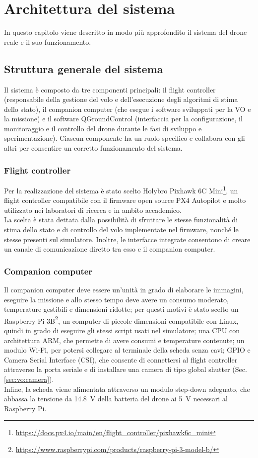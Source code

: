 \chapter{Architettura del sistema}
\label{chap:archi_sistema}
In questo capitolo viene descritto in modo più approfondito il sistema del drone reale e il suo funzionamento.

\section{Struttura generale del sistema}
Il sistema è composto da tre componenti principali: il flight controller (responsabile della gestione del volo e dell'esecuzione degli algoritmi di stima dello stato), il companion computer (che esegue i software sviluppati per la VO e la missione) e il software QGroundControl (interfaccia per la configurazione, il monitoraggio e il controllo del drone durante le fasi di sviluppo e sperimentazione). Ciascun componente ha un ruolo specifico e collabora con gli altri per consentire un corretto funzionamento del sistema.

\subsection{Flight controller}
\label{sec:archi:controller}
Per la realizzazione del sistema è stato scelto Holybro Pixhawk 6C Mini\footnote{\url{https://docs.px4.io/main/en/flight_controller/pixhawk6c_mini}}, un flight controller compatibile con il firmware open source PX4 Autopilot e molto utilizzato nei laboratori di ricerca e in ambito accademico. \\
La scelta è stata dettata dalla possibilità di sfruttare le stesse funzionalità di stima dello stato e di controllo del volo implementate nel firmware, nonché le stesse presenti sul simulatore. Inoltre, le interfacce integrate consentono di creare un canale di comunicazione diretto tra esso e il companion computer.
\subsection{Companion computer}
\label{sec:archi:computer}
Il companion computer deve essere un'unità in grado di elaborare le immagini, eseguire la missione e allo stesso tempo deve avere un consumo moderato, temperature gestibili e dimensioni ridotte; per questi motivi è stato scelto un Raspberry Pi 3B\footnote{\url{https://www.raspberrypi.com/products/raspberry-pi-3-model-b/}}, un computer di piccole dimensioni compatibile con Linux, quindi in grado di eseguire gli stessi script usati nel simulatore; una CPU con architettura ARM, che permette di avere consumi e temperature contenute; un modulo Wi-Fi, per potersi collegare al terminale della scheda senza cavi; GPIO e Camera Serial Interface (CSI), che consente di connettersi al flight controller attraverso la porta seriale e di installare una camera di tipo global shutter (Sec. \ref{sec:vo:camera}). \\
Infine, la scheda viene alimentata attraverso un modulo step-down adeguato, che abbassa la tensione da \SI{14,8}{\volt} della batteria del drone ai \SI{5}{\volt} necessari al Raspberry Pi.
